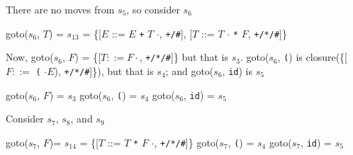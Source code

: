 \documentclass[8pt,a4paper,compress,handout]{beamer}
\newcommand{\mm}[1]{$#1$}
\newcommand{\subs}[2]{${#1}_{#2}$}
\newenvironment{spaced}
{
\smallskip
\hspace{.5cm}
\begin{minipage}[c]{\textwidth}
}
{
\end{minipage}
\smallskip
}
\begin{document}
\begin{frame}[fragile]
\pause

There are no moves from $s_5$, so consider $s_6$

\text{ }
\begin{spaced}
\begin{production}
goto(\subs{s}{6}, \mm{T}) = \subs{s}{13}
                = \{[\mm{E}  ::= \mm{E} \lstinline{+} \mm{T} \mm{\cdot}, \lstinline{+/#}],
                     [\mm{T}  ::= \mm{T} \mm{\cdot} \lstinline{*} \mm{F}, \lstinline{+/*/#}]\}
\end{production}
\end{spaced}

\pause

Now, goto($s_6$, $F$) = \{[$T  ::= F \cdot$, \lstinline{+/*/#}]\} but that is $s_3$. goto($s_6$, \lstinline{(}) is closure(\{[$F ::=$ \lstinline{(} $\cdot E$), \lstinline{+/*/#}]\}), but that is $s_4$; and goto($s_6$, \lstinline{id}) is $s_5$

\text{ }
\begin{spaced}
\begin{production}
goto(\subs{s}{6}, \mm{F}) = \subs{s}{3}
goto(\subs{s}{6}, \lstinline{(}) = \subs{s}{4}
goto(\subs{s}{6}, \lstinline{id}) = \subs{s}{5}
\end{production}
\end{spaced}

\pause

Consider $s_7$, $s_8$, and $s_9$

\text{ }
\begin{spaced}
\begin{production}
goto(\subs{s}{7}, \mm{F})= \subs{s}{14}
               = \{[\mm{T}  ::= \mm{T} \lstinline{*} \mm{F} \mm{\cdot}, \lstinline{+/*/#}]\}
goto(\subs{s}{7}, \lstinline{(}) = \subs{s}{4}
goto(\subs{s}{7}, \lstinline{id}) = \subs{s}{5}
\end{production}
\end{spaced}
\end{frame}
\end{document}
